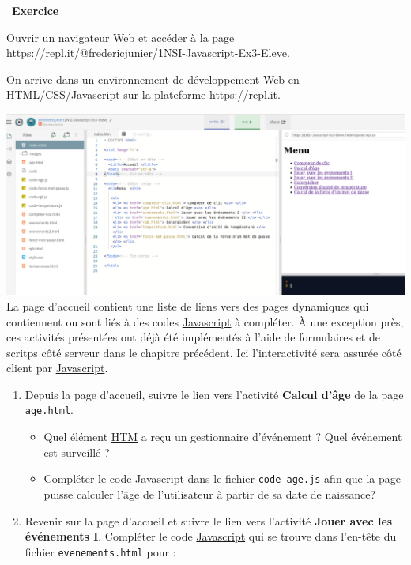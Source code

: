 \documentclass[
  11pt,
]{article}
\newcommand{\passthrough}[1]{#1}
\newcounter{exo}
\newenvironment{exercice}[1]
{\par \medskip   \addtocounter{exo}{1} \noindent  
\begin{bclogo}[arrondi =0.1,   noborder = true, logo=\bccrayon, marge=4]{~\textbf{Exercice} \textbf{\theexo} {\itshape #1} }  \par}
{
\end{bclogo}
 \par \bigskip }
\newcounter{def}
\begin{document}
\begin{exercice}{}

Ouvrir un navigateur Web et accéder à la page
\url{https://repl.it/@fredericjunier/1NSI-Javascript-Ex3-Eleve}.

On arrive dans un environnement de développement Web en
\href{https://developer.mozilla.org/fr/docs/Glossaire/HTML}{HTML}/\href{https://developer.mozilla.org/fr/docs/Glossaire/CSS}{CSS}/\href{https://developer.mozilla.org/fr/docs/Glossaire/JavaScript}{Javascript}
sur la plateforme \url{https://repl.it}.

\includegraphics{images/exo-replit.png}\\

La page d'accueil contient une liste de liens vers des pages dynamiques
qui contiennent ou sont liés à des codes
\href{https://developer.mozilla.org/fr/docs/Glossaire/JavaScript}{Javascript}
à compléter. À une exception près, ces activités présentées ont déjà été
implémentés à l'aide de formulaires et de scritps côté serveur dans le
chapitre précédent. Ici l'interactivité sera assurée côté client par
\href{https://developer.mozilla.org/fr/docs/Glossaire/JavaScript}{Javascript}.

\begin{enumerate}
\def\labelenumi{\arabic{enumi}.}
\item
  Depuis la page d'accueil, suivre le lien vers l'activité
  \textbf{Calcul d'âge} de la page \passthrough{\lstinline!age.html!}.

  \begin{itemize}
  \item
    Quel élément
    \href{https://developer.mozilla.org/fr/docs/Glossaire/HTML}{HTM} a
    reçu un gestionnaire d'événement ? Quel événement est surveillé ?
  \item
    Compléter le code
    \href{https://developer.mozilla.org/fr/docs/Glossaire/JavaScript}{Javascript}
    dans le fichier \passthrough{\lstinline!code-age.js!} afin que la
    page puisse calculer l'âge de l'utilisateur à partir de sa date de
    naissance?
  \end{itemize}
\item
  Revenir sur la page d'accueil et suivre le lien vers l'activité
  \textbf{Jouer avec les événements I}. Compléter le code
  \href{https://developer.mozilla.org/fr/docs/Glossaire/JavaScript}{Javascript}
  qui se trouve dans l'en-tête du fichier
  \passthrough{\lstinline!evenements.html!} pour :


\end{enumerate}
\end{exercice}
\end{document}

